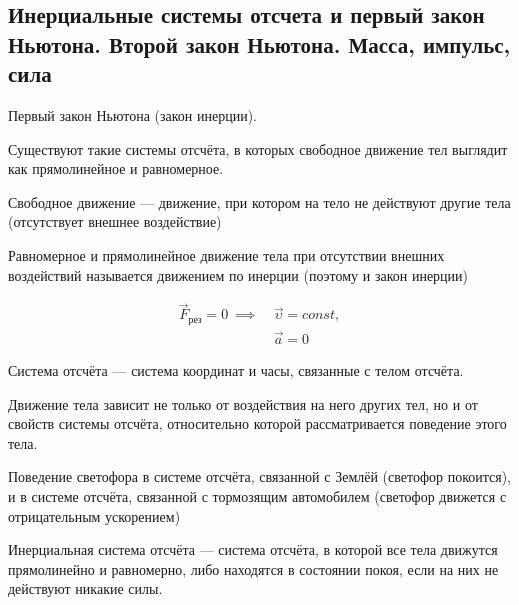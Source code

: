 \subsection{Инерциальные системы отсчета и первый закон Ньютона. Второй закон Ньютона. Масса, импульс, сила}

\begin{definition}
    Первый закон Ньютона (закон инерции).

    Существуют такие системы отсчёта, в которых свободное движение тел выглядит как прямолинейное и равномерное.
\end{definition}

\begin{definition}
    Свободное движение — движение, при котором на тело не действуют другие тела (отсутствует внешнее воздействие)
\end{definition}

\begin{definition}
    Равномерное и прямолинейное движение тела при отсутствии внешних воздействий называется движением по инерции (поэтому и закон инерции)
\end{definition}

$$
\begin{aligned}
\vec F_{рез}=0\ \implies\ &\vec\upsilon=const,\\
&\vec a=0
\end{aligned}
$$

\begin{definition}
    Система отсчёта — система координат и часы, связанные с телом отсчёта. 

    Движение тела зависит не только от воздействия на него других тел, но и 
    от свойств системы отсчёта, относительно которой рассматривается поведение этого тела.
\end{definition}

\begin{example}
    Поведение светофора в системе отсчёта, связанной с Землёй (светофор покоится), 
    и в системе отсчёта, связанной с тормозящим автомобилем (светофор движется с отрицательным ускорением)
\end{example}

\begin{definition}
    Инерциальная система отсчёта — система отсчёта, в которой все тела движутся прямолинейно и равномерно, либо находятся в состоянии покоя, 
    если на них не действуют никакие силы.
\end{definition}

